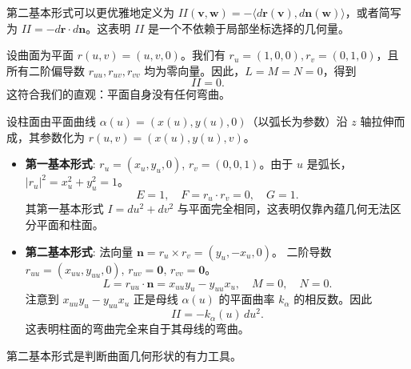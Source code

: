 \documentclass[lang=cn,10pt,thmcnt=section]{elegantbook}
\renewcommand{\vec}[1]{\mathbf{#1}}
\begin{document}
\begin{remark}[坐标无关定义]
    第二基本形式可以更优雅地定义为 $II(\vec{v}, \vec{w}) = -\langle d\vec{r}(\vec{v}), d\vec{n}(\vec{w}) \rangle$，或者简写为 $II = -d\vec{r} \cdot d\vec{n}$。这表明 $II$ 是一个不依赖于局部坐标选择的几何量。
\end{remark}
\begin{example}[平面]
    设曲面为平面 $r(u,v) = (u,v,0)$。我们有 $r_u=(1,0,0), r_v=(0,1,0)$，且所有二阶偏导数 $r_{uu}, r_{uv}, r_{vv}$ 均为零向量。因此，$L=M=N=0$，得到
    \[
    II = 0.
    \]
    这符合我们的直观：平面自身没有任何弯曲。
\end{example}

\begin{example}[柱面]
    设柱面由平面曲线 $\alpha(u) = (x(u), y(u), 0)$（以弧长为参数）沿 $z$ 轴拉伸而成，其参数化为 $r(u,v) = (x(u), y(u), v)$。
    \begin{itemize}
        \item \textbf{第一基本形式}: $r_u = (x_u, y_u, 0)$, $r_v = (0,0,1)$。由于 $u$ 是弧长，$|r_u|^2 = x_u^2+y_u^2=1$。
        \[ E=1, \quad F=r_u \cdot r_v = 0, \quad G=1. \]
        其第一基本形式 $I=du^2+dv^2$ 与平面完全相同，这表明仅靠內蕴几何无法区分平面和柱面。
        
        \item \textbf{第二基本形式}: 法向量 $\vec{n} = r_u \times r_v = (y_u, -x_u, 0)$。
        二阶导数 $r_{uu} = (x_{uu}, y_{uu}, 0)$, $r_{uv}=\vec{0}$, $r_{vv}=\vec{0}$。
        \[
        L = r_{uu} \cdot \vec{n} = x_{uu}y_u - y_{uu}x_u, \quad M=0, \quad N=0.
        \]
        注意到 $x_{uu}y_u - y_{uu}x_u$ 正是母线 $\alpha(u)$ 的平面曲率 $k_\alpha$ 的相反数。因此
        \[
        II = -k_\alpha(u) \, du^2.
        \]
        这表明柱面的弯曲完全来自于其母线的弯曲。
    \end{itemize}
\end{example}
第二基本形式是判断曲面几何形状的有力工具。
\end{document}
